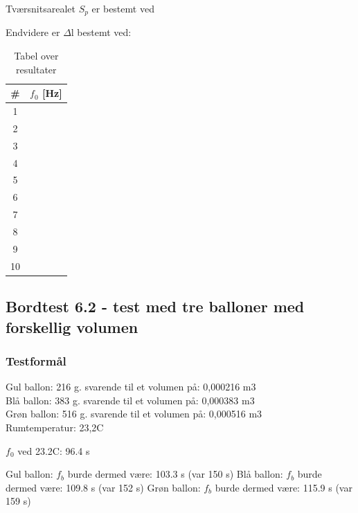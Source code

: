 		Tværsnitsarealet $S_{p}$ er bestemt ved
		\Sp
		
		Endvidere er $\Delta$l bestemt ved: 
		\deltal
		\Sp
	
	

	
	
			
		\begin{table}[]
\centering
\caption{Tabel over resultater}
\label{bordtest6resultater}
\begin{tabular}{c|l}
\textbf{\#}& \textbf{$f_{0}$ {[Hz]}} \\
\hline
1  &                  \\
2  &                  \\
3  &                  \\
4  &                  \\
5  &                  \\
6  &                  \\
7  &                  \\
8  &                  \\
9  &                  \\
10 &                 
\end{tabular}
\end{table}
			

\subsection{Bordtest 6.2 - test med tre balloner med forskellig volumen}

\subsubsection{Testformål}
	

Gul ballon: 216 g. svarende til et volumen på: 0,000216 m3\\ 
Blå ballon: 383 g. svarende til et volumen på: 0,000383 m3\\
Grøn ballon: 516 g. svarende til et volumen på: 0,000516 m3\\

Rumtemperatur: 23,2\degree C

		
	
$f_{0}$ ved 23.2\degree C: 96.4 s

Gul ballon: $f_{b}$ burde dermed være: 103.3 s (var 150 s) 
Blå ballon: $f_{b}$ burde dermed være: 109.8 s (var 152 s)
Grøn ballon: $f_{b}$ burde dermed være: 115.9 s (var 159 s) 		
	
	
	

	